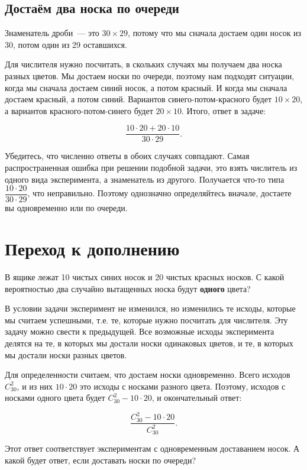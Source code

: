 \documentclass{article}
\renewcommand{\c}[2]{$C_{#1}^{#2}$}
\newcommand{\cc}[2]{C_{#1}^{#2}}
\newenvironment{exercise}{%
\begin{framed}\par\noindent\slshape%
}%
{\end{framed}}
\begin{document}
\subsection{Достаём два носка по очереди}

Знаменатель дроби~--- это $30\times29$, потому что мы сначала достаем один носок из 30, потом один из 29 оставшихся.

Для числителя нужно посчитать, в скольких случаях мы получаем два носка разных цветов. Мы достаем носки по очереди, поэтому нам подходят ситуации, когда мы сначала достаем синий носок, а потом красный. И когда мы сначала достаем красный, а потом синий. Вариантов синего-потом-красного будет $10\times20$, а вариантов красного-потом-синего будет $20\times10$. Итого, ответ в задаче:

$$\dfrac{10\cdot20 + 20\cdot10}{30\cdot29}.$$

Убедитесь, что численно ответы в обоих случаях совпадают. Самая распространенная ошибка при решении подобной задачи, это взять числитель из одного вида эксперимента, а знаменатель из другого. Получается что-то типа $\dfrac{10\cdot20}{30\cdot29}$, что неправильно. Поэтому однозначно определяйтесь вначале, достаете вы одновременно или по очереди.

\section{Переход к дополнению}

\begin{exercise}
	В ящике лежат 10 чистых синих носок и 20 чистых красных носков. С какой вероятностью два случайно вытащенных носка будут \textbf{одного} цвета?
\end{exercise}

В условии задачи эксперимент не изменился, но изменились те исходы, которые мы считаем успешными, т.е. те, которые нужно посчитать для числителя. Эту задачу можно свести к предыдущей. Все возможные исходы эксперимента делятся на те, в которых мы достали носки одинаковых цветов, и те, в которых мы достали носки разных цветов.

Для определенности считаем, что достаем носки одновременно. Всего исходов \c{30}2, и из них $10\cdot20$ это исходы с носками разного цвета. Поэтому, исходов с носками одного цвета будет $\cc{30}{2}-10\cdot20$, и окончательный ответ:

$$\dfrac{\cc{30}{2}-10\cdot20}{\cc{30}{2}}.$$

\begin{exercise}
	Этот ответ соответствует экспериментам с одновременным доставанием носок. А какой будет ответ, если доставать носки по очереди?
\end{exercise}
\end{document}
